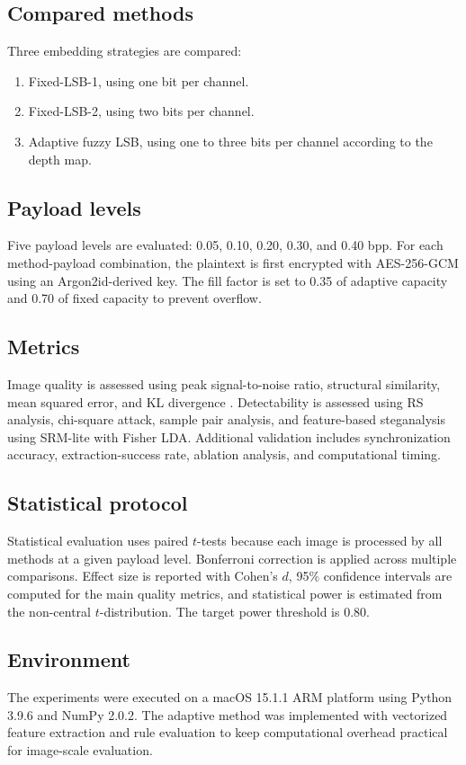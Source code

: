 \subsection{Compared methods}
Three embedding strategies are compared:
\begin{enumerate}[leftmargin=1.2cm]
    \item Fixed-LSB-1, using one bit per channel.
    \item Fixed-LSB-2, using two bits per channel.
    \item Adaptive fuzzy LSB, using one to three bits per channel according to the depth map.
\end{enumerate}

\subsection{Payload levels}
Five payload levels are evaluated: 0.05, 0.10, 0.20, 0.30, and 0.40 bpp. For each method-payload combination, the plaintext is first encrypted with AES-256-GCM using an Argon2id-derived key. The fill factor is set to 0.35 of adaptive capacity and 0.70 of fixed capacity to prevent overflow.

\subsection{Metrics}
Image quality is assessed using peak signal-to-noise ratio, structural similarity, mean squared error, and KL divergence \cite{wang2004}. Detectability is assessed using RS analysis, chi-square attack, sample pair analysis, and feature-based steganalysis using SRM-lite with Fisher LDA. Additional validation includes synchronization accuracy, extraction-success rate, ablation analysis, and computational timing.

\subsection{Statistical protocol}
Statistical evaluation uses paired \(t\)-tests because each image is processed by all methods at a given payload level. Bonferroni correction is applied across multiple comparisons. Effect size is reported with Cohen's \(d\), 95\% confidence intervals are computed for the main quality metrics, and statistical power is estimated from the non-central \(t\)-distribution. The target power threshold is 0.80.

\subsection{Environment}
The experiments were executed on a macOS 15.1.1 ARM platform using Python 3.9.6 and NumPy 2.0.2. The adaptive method was implemented with vectorized feature extraction and rule evaluation to keep computational overhead practical for image-scale evaluation.

